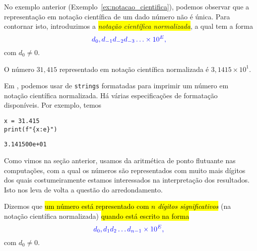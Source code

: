 No exemplo anterior (Exemplo~\ref{ex:notacao_cientifica}), podemos observar que a representação em notação científica de um dado número não é única. Para contornar isto, introduzimos a \colorbox{yellow}{\emph{notação científica normalizada}}, a qual tem a forma
\begin{equation}
  \color{blue}d_0,d_{-1}d_{-2}d_{-3}\ldots\times 10^{E},
\end{equation}
com $d_0 \neq 0$.

\begin{ex}
  O número $31,415$ representado em notação científica normalizada é $3,1415\times 10^{1}$.

  Em {\python}, podemos usar de \texttt{strings} formatadas para imprimir um número em notação científica normalizada. Há várias especificações de formatação disponíveis. Por exemplo, temos

\begin{lstlisting}
x = 31.415
print(f"{x:e}")
\end{lstlisting}

\begin{verbatim}
3.141500e+01
\end{verbatim}

\end{ex}

Como vimos na seção anterior, usamos da aritmética de ponto flutuante nas computações, com a qual os números são representados com muito mais dígitos dos quais costumeiramente estamos interessados na interpretação dos resultados. Isto nos leva de volta a questão do arredondamento.

Dizemos que \hl{um número está representado com $n$ \emph{dígitos significativos}} (na notação científica normalizada) \hl{quando está escrito na forma}
\begin{equation}
  \color{blue}d_0,d_{1}d_{2}\ldots d_{n-1}\times 10^{E},
\end{equation}
com $d_0\neq 0$.

